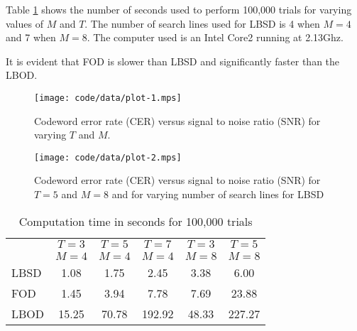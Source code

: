 \documentclass[conference]{IEEEtran}
\begin{document}
Table \ref{tab_comptime} shows the number of seconds used to perform 100,000 trials for varying values of $M$ and $T$.  The number of search lines used for LBSD is 4 when $M=4$ and 7 when $M=8$.  The computer used is an Intel Core2 running at 2.13Ghz. 

It is evident that FOD is slower than LBSD and significantly faster than the LBOD.

\begin{figure}[htb]
	\centering
		\texttt{[image: code/data/plot-1.mps]}
		\caption{Codeword error rate (CER) versus signal to noise ratio (SNR) for varying $T$ and $M$.}
		\label{fig_plot}
\end{figure}

\begin{figure}[htb]
	\centering
		\texttt{[image: code/data/plot-2.mps]}
		\caption{Codeword error rate (CER) versus signal to noise ratio (SNR) for $T=5$ and $M=8$ and for varying number of search lines for LBSD}
		\label{fig_plot2}
\end{figure}


\begin{table}[htbp]
\begin{center}
\caption{Computation time in seconds for 100,000 trials}
\begin{tabular}{lccccc}
 & $T=3$ & $T=5$ & $T=7$ & $T=3$ & $T=5$\\
 & $M=4$ & $M=4$ & $M=4$ & $M=8$ & $M=8$\\ \toprule
LBSD & 1.08 & 1.75 & 2.45 & 3.38 & 6.00 \\ 
FOD & 1.45 & 3.94 & 7.78 & 7.69 & 23.88 \\ 
LBOD & 15.25 & 70.78 & 192.92 & 48.33 & 227.27  \\ \bottomrule
\end{tabular}
\end{center}
\label{tab_comptime}
\end{table}
\end{document}

